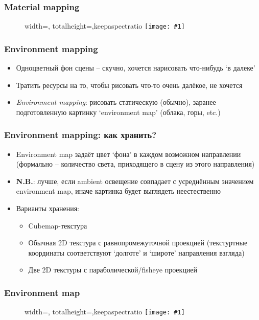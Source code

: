 \documentclass[10pt]{beamer}
\newcommand{\slideimage}[1]{
  \begin{figure}
    \begin{adjustbox}{width=\textwidth, totalheight=\textheight-2\baselineskip-2\baselineskip,keepaspectratio}
      \texttt{[image: \#1]}
    \end{adjustbox}
  \end{figure}
}
\begin{document}
\begin{frame}[fragile]
\frametitle{Material mapping}
\slideimage{material_map.png}
\end{frame}

\begin{frame}[fragile]
\frametitle{Environment mapping}
\begin{itemize}
\item Одноцветный фон сцены -- скучно, хочется нарисовать что-нибудь `в далеке'
\pause
\item Тратить ресурсы на то, чтобы рисовать что-то очень далёкое, не хочется
\pause
\item \textit{Environment mapping}: рисовать статическую (обычно), заранее подготовленную картинку `environment map' (облака, горы, etc.)
\end{itemize}
\end{frame}

\begin{frame}[fragile]
\frametitle{Environment mapping: как хранить?}
\begin{itemize}
\item Environment map задаёт цвет `фона' в каждом возможном направлении (формально -- количество света, приходящего в сцену из этого направления)
\pause
\item \textbf{\alert{N.B.}}: лучше, если ambient освещение совпадает с усреднённым значением environment map, иначе картинка будет выглядеть неестественно
\pause
\item Варианты хранения:
\begin{itemize}
\item Cubemap-текстура
\pause
\item Обычная 2D текстура с равнопромежуточной проекцией (текстуртные координаты соответствуют `долготе' и `широте' направления взгляда)
\pause
\item Две 2D текстуры с параболической/fisheye проекцией
\end{itemize}
\end{itemize}
\end{frame}

\begin{frame}[fragile]
\frametitle{Environment map}
\slideimage{env-map.jpg}
\end{frame}
\end{document}
